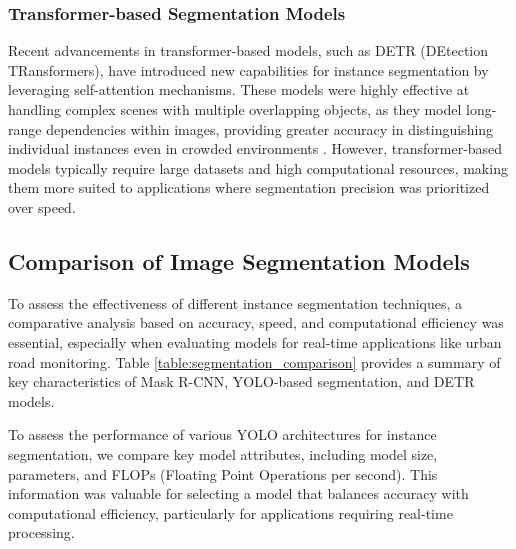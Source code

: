 \subsubsection{Transformer-based Segmentation Models}
Recent advancements in transformer-based models, such as DETR (DEtection TRansformers), have introduced new capabilities for instance segmentation by leveraging self-attention mechanisms. These models were highly effective at handling complex scenes with multiple overlapping objects, as they model long-range dependencies within images, providing greater accuracy in distinguishing individual instances even in crowded environments \citep{Carion2020}. However, transformer-based models typically require large datasets and high computational resources, making them more suited to applications where segmentation precision was prioritized over speed.

\subsection{Comparison of Image Segmentation Models}

To assess the effectiveness of different instance segmentation techniques, a comparative analysis based on accuracy, speed, and computational efficiency was essential, especially when evaluating models for real-time applications like urban road monitoring. Table \ref{table:segmentation_comparison} provides a summary of key characteristics of Mask R-CNN, YOLO-based segmentation, and DETR models.

\begin{table}[H]
\centering
{}
\caption{Comparison of instance segmentation models in terms of accuracy, processing speed, and computational efficiency.}
\label{table:segmentation_comparison}
\end{table}


To assess the performance of various YOLO architectures for instance segmentation, we compare key model attributes, including model size, parameters, and FLOPs (Floating Point Operations per second). This information was valuable for selecting a model that balances accuracy with computational efficiency, particularly for applications requiring real-time processing.

